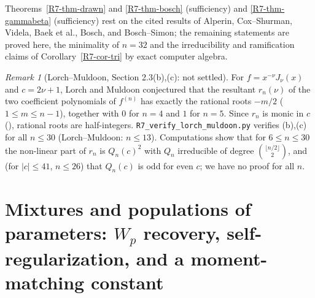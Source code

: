 \documentclass[11pt]{amsart}
\theoremstyle{definition}
\theoremstyle{remark}
\newtheorem{remark}[theorem]{Remark}
\begin{document}
Theorems~\ref{R7-thm-drawn} and \ref{R7-thm-bosch} (sufficiency) and
\ref{R7-thm-gammabeta} (sufficiency) rest on the cited results of
Alperin, Cox--Shurman, Videla, Baek et al., Bosch, and Bosch--Simon; the
remaining statements are proved here, the minimality of $n=32$ and the
irreducibility and ramification claims of Corollary~\ref{R7-cor-tri} by exact
computer algebra.

\begin{remark}[Lorch--Muldoon, Section 2.3(b),(c): not settled]
For $f=x^{-\nu}J_\nu(x)$ and $c=2\nu+1$, Lorch and Muldoon
\cite[Section~2.3]{R7-LM95} conjectured that the resultant $r_n(\nu)$ of the
two coefficient polynomials of $f^{(n)}$ has exactly the rational roots
$-m/2$ ($1\le m\le n-1$), together with $0$ for $n=4$ and $1$ for $n=5$. Since
$r_n$ is monic in $c$ (\cite{K-047}), rational roots are half-integers.
\texttt{R7\_\allowbreak{}verify\_\allowbreak{}lorch\_\allowbreak{}muldoon.py} verifies (b),(c) for all $n\le30$
(Lorch--Muldoon: $n\le13$). Computations show that for $6\le n\le30$ the non-linear part of $r_n$ is
$Q_n(c)^2$ with $Q_n$ irreducible of degree $\binom{\lfloor n/2\rfloor}{2}$,
and (for $|c|\le41$, $n\le26$) that $Q_n(c)$ is odd for even $c$; we have no
proof for all $n$.
\end{remark}


\providecommand{\RfE}{\mathbb{E}}
\providecommand{\RfP}{\mathbb{P}}
\providecommand{\RfR}{\mathbb{R}}
\providecommand{\RfZ}{\mathbb{Z}}
\providecommand{\Rfd}{\,\mathrm{d}}
\providecommand{\Rffold}{\operatorname{fold}}
\providecommand{\RfBin}{\operatorname{Bin}}
\providecommand{\RfLip}{\operatorname{Lip}}

\section{Mixtures and populations of parameters: \texorpdfstring{$W_p$}{Wp} recovery, self-regularization, and a moment-matching constant}
\label{R5:sec}
\end{document}
